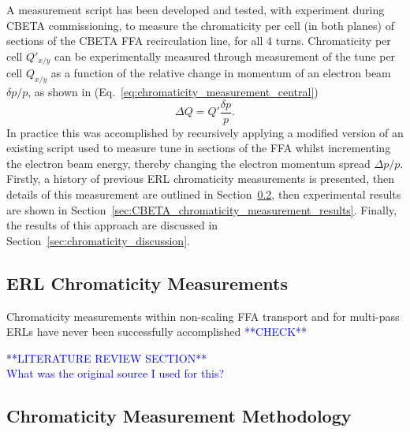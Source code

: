 \documentclass[../main.tex]{subfiles}
\begin{document}
A measurement script has been developed and tested, with experiment during CBETA commissioning, to measure the chromaticity per cell (in both planes) of sections of the CBETA FFA recirculation line, for all 4 turns. Chromaticity per cell $Q'_{x/y}$ can be experimentally measured through measurement of the tune per cell $Q_{x/y}$ as a function of the relative change in momentum of an electron beam $\delta p/p$, as shown in (Eq.~\ref{eq:chromaticity_measurement_central})
\begin{equation}
\Delta Q = Q'\frac{\delta p}{p}.
\label{eq:chromaticity_measurement_central}
\end{equation}
In practice this was accomplished by recursively applying a modified version of an existing script used to measure tune in sections of the FFA whilst incrementing the electron beam energy, thereby changing the electron momentum spread $\Delta p/p$. Firstly, a history of previous ERL chromaticity measurements is presented, then details of this measurement are outlined in Section~\ref{sec:chromaticity_measurement_methodology}, then experimental results are shown in Section~\ref{sec:CBETA_chromaticity_measurement_results}. Finally, the results of this approach are discussed in Section~\ref{sec:chromaticity_discussion}. 

\subsection{ERL Chromaticity Measurements}
\label{sec:ERL_chromaticity_measurements}

Chromaticity measurements within non-scaling FFA transport and for multi-pass ERLs have never been successfully accomplished \textcolor{blue}{**CHECK**}

\textcolor{blue}{**LITERATURE REVIEW SECTION** \\ What was the original source I used for this? }

\subsection{Chromaticity Measurement Methodology}
\label{sec:chromaticity_measurement_methodology}
\end{document}
